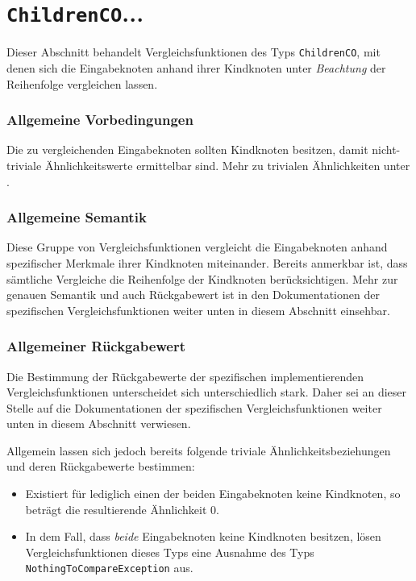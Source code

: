 %
%

\section{\texttt{ChildrenCO}...}
\label{strct:spec:childrenco}
Dieser Abschnitt behandelt Vergleichsfunktionen des Typs \texttt{ChildrenCO}, mit denen sich die Eingabeknoten anhand ihrer Kindknoten unter \emph{Beachtung} der Reihenfolge vergleichen lassen.

\subsubsection*{Allgemeine Vorbedingungen}
Die zu vergleichenden Eingabeknoten sollten Kindknoten besitzen, damit nicht-triviale Ähnlichkeitswerte ermittelbar sind. Mehr zu trivialen Ähnlichkeiten unter .

\subsubsection*{Allgemeine Semantik}
Diese Gruppe von Vergleichsfunktionen vergleicht die Eingabeknoten anhand spezifischer Merkmale ihrer Kindknoten miteinander. Bereits anmerkbar ist, dass sämtliche Vergleiche die Reihenfolge der Kindknoten berücksichtigen. Mehr zur genauen Semantik und auch Rückgabewert ist in den Dokumentationen der spezifischen Vergleichsfunktionen weiter unten in diesem Abschnitt einsehbar.

\subsubsection*{Allgemeiner Rückgabewert}
Die Bestimmung der Rückgabewerte der spezifischen implementierenden Vergleichsfunktionen unterscheidet sich unterschiedlich stark. Daher sei an dieser Stelle auf die Dokumentationen der spezifischen Vergleichsfunktionen weiter unten in diesem Abschnitt verwiesen.

Allgemein lassen sich jedoch bereits folgende triviale Ähnlichkeitsbeziehungen und deren Rückgabewerte bestimmen:
\begin{itemize}
	\item Existiert für lediglich einen der beiden Eingabeknoten keine Kindknoten, so beträgt die resultierende Ähnlichkeit $0$.
	\item In dem Fall, dass \emph{beide} Eingabeknoten keine Kindknoten besitzen, lösen Vergleichsfunktionen dieses Typs eine Ausnahme des Typs \texttt{NothingToCompareException} aus.
\end{itemize}

